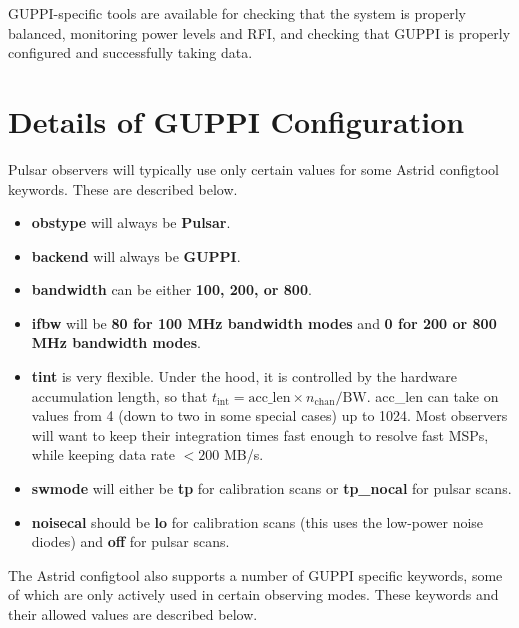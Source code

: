 GUPPI-specific tools are available for checking that the system is
properly balanced, monitoring power levels and RFI, and checking that
GUPPI is properly configured and successfully taking data.

\section{Details of GUPPI Configuration}
\label{sec:configuration}

Pulsar observers will typically use only certain values for some
Astrid configtool keywords.  These are described below.

\begin{itemize}
\item{\textbf{obstype} will always be \textbf{Pulsar}.}
\item{\textbf{backend} will always be \textbf{GUPPI}.}
\item{\textbf{bandwidth} can be either \textbf{100, 200, or 800}.}
\item{\textbf{ifbw} will be \textbf{80 for 100 MHz bandwidth modes}
    and \textbf{0 for 200 or 800 MHz bandwidth modes}.}
\item{\textbf{tint} is very flexible.  Under the hood, it is
    controlled by the hardware accumulation length, so that
    $t_\mathrm{int} = \mathrm{acc\_len} \times
    n_\mathrm{chan}/\mathrm{BW}$.  acc\_len can take on values from 4
    (down to two in some special cases) up to 1024.  Most observers
    will want to keep their integration times fast enough to resolve
    fast MSPs, while keeping data rate $< 200$ MB/s.}
\item{\textbf{swmode} will either be \textbf{tp} for calibration scans
    or \textbf{tp\_nocal} for pulsar scans.}
\item{\textbf{noisecal} should be \textbf{lo} for calibration scans
    (this uses the low-power noise diodes) and \textbf{off} for pulsar
    scans.}
\end{itemize}

The Astrid configtool also supports a number of GUPPI specific
keywords, some of which are only actively used in certain observing
modes. These keywords and their allowed values are described below.

